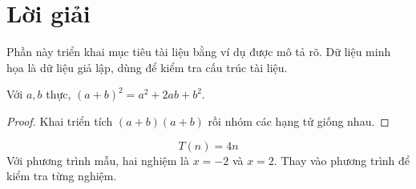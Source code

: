 \section{Lời giải}


\label{sec:chapter2}
Phần này triển khai mục tiêu tài liệu bằng ví dụ được mô tả rõ. Dữ liệu minh họa là dữ liệu giả lập, dùng để kiểm tra cấu trúc tài liệu.

\begin{demotheorem}
Với $a,b$ thực, $(a+b)^2=a^2+2ab+b^2$.
\end{demotheorem}
\begin{proof}
Khai triển tích $(a+b)(a+b)$ rồi nhóm các hạng tử giống nhau.
\end{proof}
\[T(n)=4n\]
Với phương trình mẫu, hai nghiệm là $x=-2$ và $x=2$. Thay vào phương trình để kiểm tra từng nghiệm.
